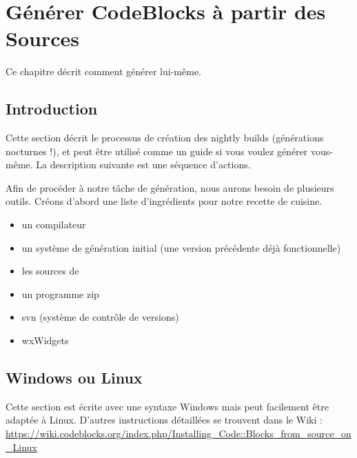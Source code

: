\chapter{Générer CodeBlocks à partir des Sources}\label{sec:build_codeblocks}

Ce chapitre décrit comment générer \codeblocks lui-même.


\section{Introduction}

Cette section décrit le processus de création des nightly builds (générations nocturnes !), et peut être utilisé comme un guide si vous voulez générer \codeblocks vous-même. La description suivante est une séquence d'actions.

Afin de procéder à notre tâche de génération, nous aurons besoin de plusieurs outils. Créons d'abord une liste d'ingrédients pour notre recette de cuisine.

\begin{itemize}[noitemsep]
\item un compilateur
\item un système de génération initial (une version précédente déjà fonctionnelle)
\item les sources de \codeblocks
\item un programme zip
\item svn (système de contrôle de versions)
\item wxWidgets
\end{itemize}

\section{Windows ou Linux}

Cette section est écrite avec une syntaxe Windows mais peut facilement être adaptée à Linux.
D'autres instructions détaillées se trouvent dans le Wiki : \url{https://wiki.codeblocks.org/index.php/Installing_Code::Blocks_from_source_on_Linux}


